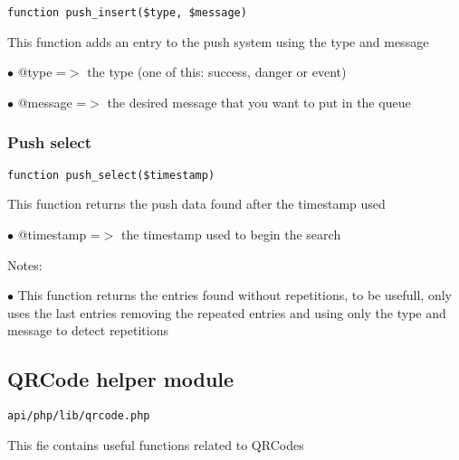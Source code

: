 \documentclass[a4paper]{article}
\begin{document}
\begin{lstlisting}
function push_insert($type, $message)
\end{lstlisting}

This function adds an entry to the push system using the type and message

\begin{compactitem}
\item[\color{myblue}$\bullet$] @type    =$>$ the type (one of this: success, danger or event)
\item[\color{myblue}$\bullet$] @message =$>$ the desired message that you want to put in the queue
\end{compactitem}

\hypertarget{toc520}{}
\subsubsection{Push select}

\begin{lstlisting}
function push_select($timestamp)
\end{lstlisting}

This function returns the push data found after the timestamp used

\begin{compactitem}
\item[\color{myblue}$\bullet$] @timestamp =$>$ the timestamp used to begin the search
\end{compactitem}

Notes:

\begin{compactitem}
\item[\color{myblue}$\bullet$] This function returns the entries found without repetitions, to be
  usefull, only uses the last entries removing the repeated entries and
  using only the type and message to detect repetitions
\end{compactitem}

\hypertarget{toc521}{}
\subsection{QRCode helper module}

\begin{lstlisting}
api/php/lib/qrcode.php
\end{lstlisting}

This fie contains useful functions related to QRCodes

\hypertarget{toc522}{}
\end{document}
